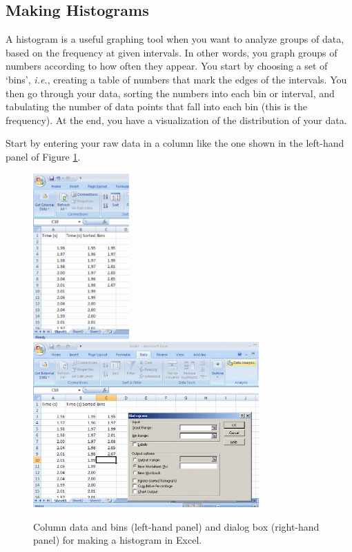\subsection{Making Histograms}

A histogram is a useful graphing tool when you want to analyze groups of data, based on the frequency at given intervals. 
In other words, you graph groups of numbers according to how often they appear.
You start by choosing a set of `bins', {\it i.e.}, creating a table of numbers that mark the edges of the intervals.
You then go through your data, sorting the numbers into each bin or interval, and tabulating the number of data points that fall into each bin (this is the 
frequency).
At the end, you have a visualization of the distribution of your data.   

Start by entering your raw data in a column like the one shown in the left-hand panel of Figure \ref{hist2}.
\begin{figure}[b!]
\begin{center}
\includegraphics[height=2.5in]{appendices/excelfigs/histf1.eps}
\hspace{0.4in}
\includegraphics[height=2.5in]{appendices/excelfigs/histf2.eps}
\caption{Column data and bins (left-hand panel) and dialog box (right-hand panel)  for making a histogram in Excel.}\label{hist2}
\end{center}
\end{figure}
